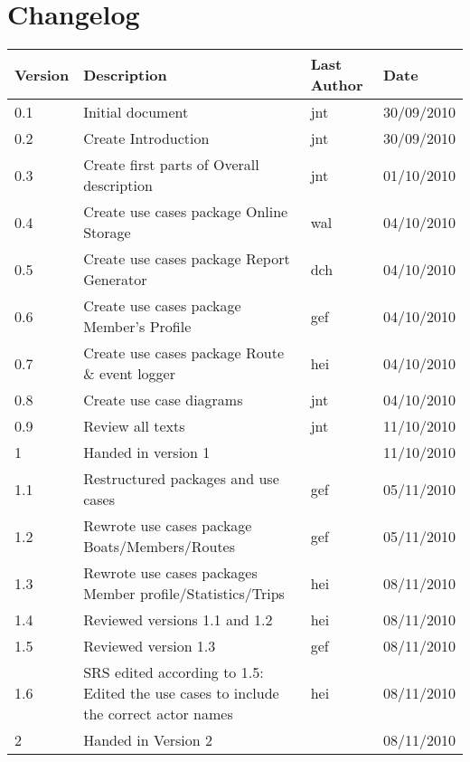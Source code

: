 \section*{Changelog}

\begin{table}[h!]
	\begin{center}
		\begin{tabular}{|l|l|l|l|}
			\hline
			\rowcolor{fontys_pink_light}Version	&Description	&Last Author	&Date\\
			\hline
			0.1	&Initial document	&jnt	&30/09/2010\\
			\hline
			0.2	&Create Introduction	&jnt	&30/09/2010\\
			\hline
			0.3	&Create first parts of Overall description	&jnt	&01/10/2010\\
			\hline
			0.4	&Create use cases package Online Storage&wal	&04/10/2010\\
			\hline
			0.5	&Create use cases package Report Generator	&dch	&04/10/2010\\
			\hline
			0.6	&Create use cases package Member's Profile	&gef	&04/10/2010\\
			\hline
			0.7	&Create use cases package Route \& event logger	&hei	&04/10/2010\\
			\hline
			0.8	&Create use case diagrams	&jnt	&04/10/2010\\
			\hline
			0.9	&Review all texts	&jnt	&11/10/2010\\
			\hline
			\rowcolor{fontysgreen2}1	& Handed in version 1 & &11/10/2010\\
			\hline
			1.1	&Restructured packages and use cases	&gef	&05/11/2010\\
			\hline
			1.2	&Rewrote use cases package Boats/Members/Routes	&gef	&05/11/2010\\
			\hline
			1.3	&Rewrote use cases packages Member profile/Statistics/Trips 	&hei	&08/11/2010\\
			\hline
			1.4	&Reviewed versions 1.1 and 1.2  &hei	&08/11/2010\\
			\hline
			1.5	&Reviewed version 1.3  &gef	&08/11/2010\\
			\hline
			1.6	&SRS edited according to 1.5: Edited the use cases to include the correct actor names  &hei	&08/11/2010\\
			\hline
			\rowcolor{fontysgreen2}2	&Handed in Version 2  &	&08/11/2010\\

		\hline
		\end{tabular}
	\end{center}
	\label{tab:changelog}
\end{table}
